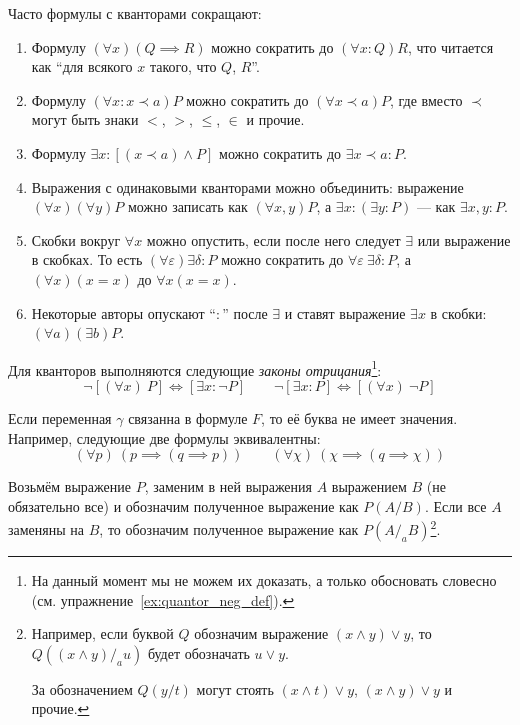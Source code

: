 Часто формулы с кванторами сокращают:
\begin{enumerate}
	\item{}Формулу ${(\forall x)(Q\implies R)}$ можно сократить
	до ${(\forall x:Q)R}$, что читается как ``для всякого $x$ такого, что
	$Q$, $R$''.

	\item{}Формулу ${(\forall x:x\prec a)P}$ можно сократить до ${(\forall x\prec a)P}$,
	где вместо $\prec$ могут быть знаки $<$, $>$, $\leq$, $\in$ и прочие.

	\item{}Формулу $\exists x:[(x\prec a)\land P]$ можно сократить
	до $\exists x\prec a:P$.

	\item{}Выражения с одинаковыми кванторами можно объединить:
	выражение $(\forall x)(\forall y)P$ можно записать как $(\forall x,y)P$,
	а ${\exists x:(\exists y:P)}$ --- как $\exists x,y:P$.

	\item{}Скобки вокруг $\forall x$ можно опустить, если после него следует $\exists$ или
	выражение в скобках.
	То есть ${(\forall \varepsilon)\exists \delta:P}$
	можно сократить до $\forall \varepsilon~\exists \delta:P$,
	а $(\forall x)(x=x)$ до $\forall x(x=x)$.

	\item{}Некоторые авторы опускают ``$:$'' после $\exists$ и
	ставят выражение $\exists x$ в скобки: $(\forall a)(\exists b)P$.
\end{enumerate}

\pagebreak

Для кванторов выполняются следующие {\it законы отрицания}\footnote{
	На данный момент мы не можем их доказать, а только
	обосновать словесно (см. упражнение~\ref{ex:quantor_neg_def}).
}:
\[
	\lnot[(\forall x)~P]\iff[\exists x:\lnot P]\qquad
	\lnot[\exists x:P]\iff[(\forall x)~\lnot P]
\]

Если переменная $\gamma$ связанна в формуле $F$, то её буква не имеет значения.
Например, следующие две формулы эквивалентны:
\[
	(\forall p)~(p\implies (q\implies p))\qquad
	(\forall \chi)~(\chi\implies (q\implies\chi))
\]

Возьмём выражение $P$, заменим в ней выражения $A$ выражением $B$ (не обязательно все)
и обозначим полученное выражение как $P(A/B)$. Если все $A$ заменяны
на $B$, то обозначим полученное выражение как $P(A/_{a}B)$\footnote{
Например, если буквой $Q$ обозначим выражение $(x\land y)\lor y$,
то $Q((x\land y)/_{a}u)$ будет обозначать $u\lor y$.

За обозначением $Q(y/t)$ могут стоять
$(x\land t)\lor y$, $(x\land y)\lor y$ и прочие.
}.

